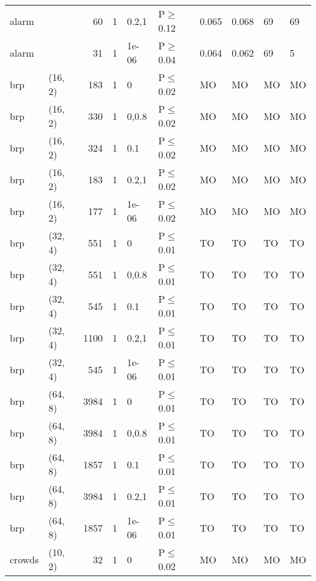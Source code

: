 \begin{longtable}{llrrllllll}
 alarm         &          &     	60 & 1 & 0.2,1 & P$\geq$0.12  & 0.065    & 0.068    & 69      & 69     \\
 alarm         &          &     	31 & 1 & 1e-06 & P$\geq$0.04  & 0.064    & 0.062    & 69      & 5      \\
 brp           & (16, 2)  &    	183 & 1 & 0     & P$\leq$0.02  & MO       & MO       & MO      & MO     \\
 brp           & (16, 2)  &    	330 & 1 & 0,0.8 & P$\leq$0.02  & MO       & MO       & MO      & MO     \\
 brp           & (16, 2)  &    	324 & 1 & 0.1   & P$\leq$0.02  & MO       & MO       & MO      & MO     \\
 brp           & (16, 2)  &    	183 & 1 & 0.2,1 & P$\leq$0.02  & MO       & MO       & MO      & MO     \\
 brp           & (16, 2)  &    	177 & 1 & 1e-06 & P$\leq$0.02  & MO       & MO       & MO      & MO     \\
 brp           & (32, 4)  &    	551 & 1 & 0     & P$\leq$0.01  & TO       & TO       & TO      & TO     \\
 brp           & (32, 4)  &    	551 & 1 & 0,0.8 & P$\leq$0.01  & TO       & TO       & TO      & TO     \\
 brp           & (32, 4)  &    	545 & 1 & 0.1   & P$\leq$0.01  & TO       & TO       & TO      & TO     \\
 brp           & (32, 4)  &   	1100 & 1 & 0.2,1 & P$\leq$0.01  & TO       & TO       & TO      & TO     \\
 brp           & (32, 4)  &    	545 & 1 & 1e-06 & P$\leq$0.01  & TO       & TO       & TO      & TO     \\
 brp           & (64, 8)  &   	3984 & 1 & 0     & P$\leq$0.01  & TO       & TO       & TO      & TO     \\
 brp           & (64, 8)  &   	3984 & 1 & 0,0.8 & P$\leq$0.01  & TO       & TO       & TO      & TO     \\
 brp           & (64, 8)  &   	1857 & 1 & 0.1   & P$\leq$0.01  & TO       & TO       & TO      & TO     \\
 brp           & (64, 8)  &   	3984 & 1 & 0.2,1 & P$\leq$0.01  & TO       & TO       & TO      & TO     \\
 brp           & (64, 8)  &   	1857 & 1 & 1e-06 & P$\leq$0.01  & TO       & TO       & TO      & TO     \\
 crowds        & (10, 2)  &     	32 & 1 & 0     & P$\leq$0.02  & MO       & MO       & MO      & MO     \\

\end{longtable}

